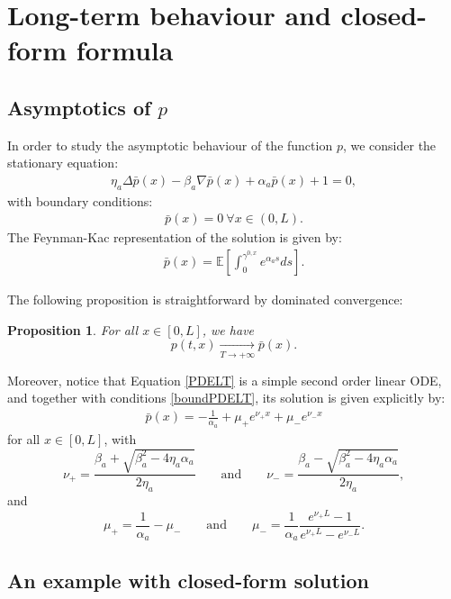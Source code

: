 \documentclass[11pt]{article}
\newtheorem{prop}{Proposition}
\begin{document}
\section{Long-term behaviour and closed-form formula}\label{sec_longtermbehavior}

\subsection{Asymptotics of $p$}

In order to study the asymptotic behaviour of the function $p$, we consider the stationary equation:
\begin{align}\label{PDELT}
    \eta_a \Delta \bar p(x) - \beta_a \nabla \bar p(x)  + \alpha_a \bar p(x) + 1 = 0,
\end{align}
with boundary conditions:
\begin{align}\label{boundPDELT}
    \bar p(x) = 0 \ \forall x \in (0,L).
\end{align}
The Feynman-Kac representation of the solution is given by:
\begin{align} \label{FKLT}
\bar p(x) = \mathbb E \left[ \int_0^{\gamma^{0,x}} e^{\alpha_a s}ds\right].  
\end{align}

The following proposition is straightforward by dominated convergence:

\begin{prop}\label{asymP}
For all $x \in [0,L]$, we have 
$$p(t,x) \underset{T\rightarrow + \infty}{\longrightarrow} \bar p(x).$$
\end{prop}

Moreover, notice that Equation \eqref{PDELT} is a simple second order linear ODE, and together with conditions \eqref{boundPDELT}, its solution is given explicitly by:
\begin{align}\label{LTP}
    \bar p(x) = -\frac 1{\alpha_a} + \mu_+ e^{\nu_+ x} + \mu_- e^{\nu_- x}
\end{align}
for all $x \in [0,L]$, with 
$$\nu_+ = \frac{\beta_a + \sqrt{\beta_a^2 - 4\eta_a \alpha_a}}{2\eta_a} \qquad \text{and} \qquad \nu_- = \frac{\beta_a - \sqrt{\beta_a^2 - 4\eta_a \alpha_a}}{2\eta_a},$$
and
$$\mu_+ = \frac 1{\alpha_a} - \mu_- \qquad \text{and} \qquad \mu_- = \frac{1}{\alpha_a} \frac{e^{\nu_+L} - 1}{e^{\nu_+ L} - e^{\nu_- L}}.$$

\subsection{An example with closed-form solution}
\end{document}
